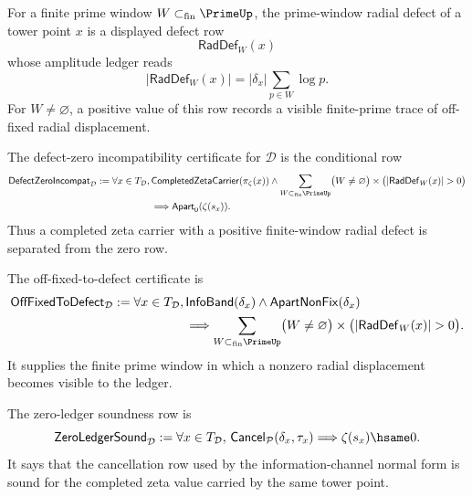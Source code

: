 \begin{definition}
\label{def:prime-window-radial-defect}
For a finite prime window $W\subset_{\mathrm{fin}}\PrimeUp$, the
prime-window radial defect of a tower point $x$ is a displayed defect row
$$
\mathsf{RadDef}_{W}(x)
$$
whose amplitude ledger reads
$$
|\mathsf{RadDef}_{W}(x)|
=
|\delta_x|\sum_{p\in W}\log p.
$$
For $W\neq\varnothing$, a positive value of this row records a visible
finite-prime trace of off-fixed radial displacement.
\end{definition}

\begin{definition}
\label{def:defect-zero-incompatibility-certificate}
The defect-zero incompatibility certificate for $\mathcal D$ is the
conditional row
$$
\begin{aligned}
\mathsf{DefectZeroIncompat}_{\mathcal D}
:=
\forall x\in T_{\mathcal D},\,&
\mathsf{CompletedZetaCarrier}(\pi_\zeta(x))
\wedge
\sum_{W\subset_{\mathrm{fin}}\PrimeUp}
\bigl(W\neq\varnothing\bigr)
\times
\bigl(|\mathsf{RadDef}_{W}(x)|>0\bigr)
\\
&\Longrightarrow
\mathsf{Apart}_{0}(\zeta(s_x)).
\end{aligned}
$$
Thus a completed zeta carrier with a positive finite-window radial defect
is separated from the zero row.
\end{definition}

\begin{definition}
\label{def:off-fixed-to-defect-certificate}
The off-fixed-to-defect certificate is
$$
\begin{aligned}
\mathsf{OffFixedToDefect}_{\mathcal D}
:=
\forall x\in T_{\mathcal D},\,&
\mathsf{InfoBand}(\delta_x)
\wedge
\mathsf{ApartNonFix}(\delta_x)
\\
&\Longrightarrow
\sum_{W\subset_{\mathrm{fin}}\PrimeUp}
\bigl(W\neq\varnothing\bigr)
\times
\bigl(|\mathsf{RadDef}_{W}(x)|>0\bigr).
\end{aligned}
$$
It supplies the finite prime window in which a nonzero radial displacement
becomes visible to the ledger.
\end{definition}

\begin{definition}
\label{def:zero-ledger-soundness-row}
The zero-ledger soundness row is
$$
\mathsf{ZeroLedgerSound}_{\mathcal D}
:=
\forall x\in T_{\mathcal D},\,
\mathsf{Cancel}_{\mathcal P}(\delta_x,\tau_x)
\Longrightarrow
\zeta(s_x)\hsame 0.
$$
It says that the cancellation row used by the information-channel normal
form is sound for the completed zeta value carried by the same tower
point.
\end{definition}

